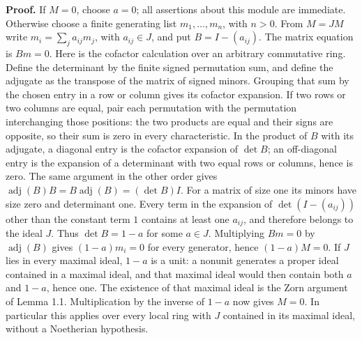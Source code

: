 \documentclass[11pt,a4paper,openany]{report}
\begin{document}
\textbf{Proof.} If \(M=0\), choose \(a=0\); all assertions about this module are immediate. Otherwise choose a finite generating list \(m_1,\ldots,m_n\), with \(n>0\). From \(M=JM\) write \(m_i=\sum_j a_{ij}m_j\), with \(a_{ij}\in J\), and put \(B=I-(a_{ij})\). The matrix equation is \(Bm=0\). Here is the cofactor calculation over an arbitrary commutative ring. Define the determinant by the finite signed permutation sum, and define the adjugate as the transpose of the matrix of signed minors. Grouping that sum by the chosen entry in a row or column gives its cofactor expansion. If two rows or two columns are equal, pair each permutation with the permutation interchanging those positions: the two products are equal and their signs are opposite, so their sum is zero in every characteristic. In the product of \(B\) with its adjugate, a diagonal entry is the cofactor expansion of \(\det B\); an off-diagonal entry is the expansion of a determinant with two equal rows or columns, hence is zero. The same argument in the other order gives \(\operatorname{adj}(B)B=B\operatorname{adj}(B)=(\det B)I\). For a matrix of size one its minors have size zero and determinant one. Every term in the expansion of \(\det(I-(a_{ij}))\) other than the constant term \(1\) contains at least one \(a_{ij}\), and therefore belongs to the ideal \(J\). Thus \(\det B=1-a\) for some \(a\in J\). Multiplying \(Bm=0\) by \(\operatorname{adj}(B)\) gives \((1-a)m_i=0\) for every generator, hence \((1-a)M=0\). If \(J\) lies in every maximal ideal, \(1-a\) is a unit: a nonunit generates a proper ideal contained in a maximal ideal, and that maximal ideal would then contain both \(a\) and \(1-a\), hence one. The existence of that maximal ideal is the Zorn argument of Lemma 1.1. Multiplication by the inverse of \(1-a\) now gives \(M=0\). In particular this applies over every local ring with \(J\) contained in its maximal ideal, without a Noetherian hypothesis.
\end{document}
